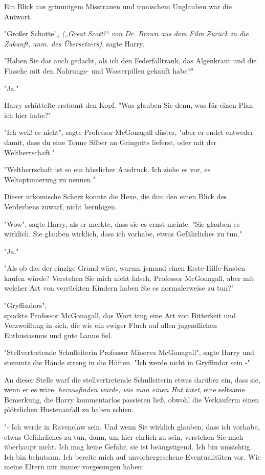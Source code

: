 {Ein Blick aus grimmigem Misstrauen und ironischem Unglauben war die Antwort.

"Großer Schotte!„ \emph{(„Great Scott!“ von Dr. Brown aus dem Film Zurück in die Zukunft, anm. des Übersetzers)}, sagte Harry.

"Haben Sie das auch gedacht, als ich den Federfalltrank, das Algenkraut und die Flasche mit den Nahrungs- und Wasserpillen gekauft habe?"

"Ja."

Harry schüttelte erstaunt den Kopf. "Was glauben Sie denn, was für einen Plan ich hier habe?"

"Ich weiß es nicht", sagte Professor McGonagall düster, "aber er endet entweder damit, dass du eine Tonne Silber an Gringotts lieferst, oder mit der Weltherrschaft."

"Weltherrschaft ist so ein hässlicher Ausdruck. Ich ziehe es vor, es Weltoptimierung zu nennen."

Dieser urkomische Scherz konnte die Hexe, die ihm den einen Blick des Verderbens zuwarf, nicht beruhigen.

"Wow", sagte Harry, als er merkte, dass sie es ernst meinte. "Sie glauben es wirklich. Sie glauben wirklich, dass ich vorhabe, etwas Gefährliches zu tun."

"Ja."

"Als ob das der einzige Grund wäre, warum jemand einen Erste-Hilfe-Kasten kaufen würde? Verstehen Sie mich nicht falsch, Professor McGonagall, aber mit welcher Art von verrückten Kindern haben Sie es normalerweise zu tun?"

"Gryffindors",\\ spuckte Professor McGonagall, das Wort trug eine Art von Bitterkeit und Verzweiflung in sich, die wie ein ewiger Fluch auf allen jugendlichen Enthusiasmus und gute Laune fiel.

"Stellvertretende Schulleiterin Professor Minerva McGonagall", sagte Harry und stemmte die Hände streng in die Hüften. "Ich werde nicht in Gryffindor sein -"

An dieser Stelle warf die stellvertretende Schulleiterin etwas darüber ein, dass sie, wenn er es wäre, \emph{herausfinden würde, wie man einen Hut tötet}, eine seltsame Bemerkung, die Harry kommentarlos passieren ließ, obwohl die Verkäuferin einen plötzlichen Hustenanfall zu haben schien.

"- Ich werde in Ravenclaw sein. Und wenn Sie wirklich glauben, dass ich vorhabe, etwas Gefährliches zu tun, dann, um hier ehrlich zu sein, verstehen Sie mich überhaupt nicht. Ich mag keine Gefahr, sie ist beängstigend. Ich bin umsichtig. Ich bin behutsam. Ich bereite mich auf unvorhergesehene Eventualitäten vor. Wie meine Eltern mir immer vorgesungen haben:

}
